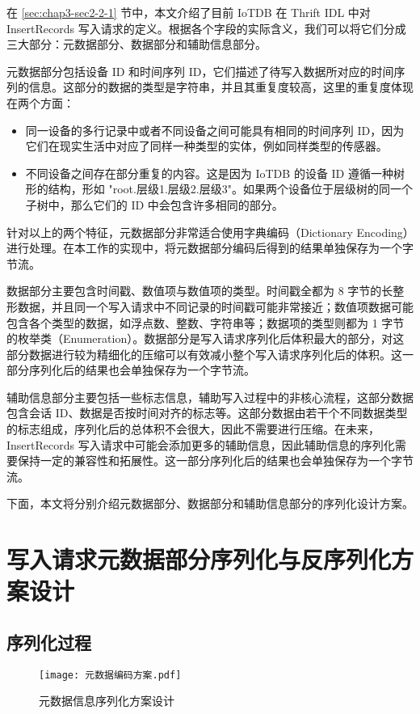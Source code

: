 在 \ref{sec:chap3-sec2-2-1} 节中，本文介绍了目前 IoTDB 在 Thrift IDL 中对 InsertRecords 写入请求的定义。根据各个字段的实际含义，我们可以将它们分成三大部分：元数据部分、数据部分和辅助信息部分。

元数据部分包括设备 ID 和时间序列 ID，它们描述了待写入数据所对应的时间序列的信息。这部分的数据的类型是字符串，并且其重复度较高，这里的重复度体现在两个方面：
\begin{itemize}
  \item 同一设备的多行记录中或者不同设备之间可能具有相同的时间序列 ID，因为它们在现实生活中对应了同样一种类型的实体，例如同样类型的传感器。
  \item 不同设备之间存在部分重复的内容。这是因为 IoTDB 的设备 ID 遵循一种树形的结构，形如 "root.层级1.层级2.层级3"。如果两个设备位于层级树的同一个子树中，那么它们的 ID 中会包含许多相同的部分。
\end{itemize}
针对以上的两个特征，元数据部分非常适合使用字典编码（Dictionary Encoding）进行处理。在本工作的实现中，将元数据部分编码后得到的结果单独保存为一个字节流。

数据部分主要包含时间戳、数值项与数值项的类型。时间戳全都为 8 字节的长整形数据，并且同一个写入请求中不同记录的时间戳可能非常接近；数值项数据可能包含各个类型的数据，如浮点数、整数、字符串等；数据项的类型则都为 1 字节的枚举类（Enumeration）。数据部分是写入请求序列化后体积最大的部分，对这部分数据进行较为精细化的压缩可以有效减小整个写入请求序列化后的体积。这一部分序列化后的结果也会单独保存为一个字节流。

辅助信息部分主要包括一些标志信息，辅助写入过程中的非核心流程，这部分数据包含会话 ID、数据是否按时间对齐的标志等。这部分数据由若干个不同数据类型的标志组成，序列化后的总体积不会很大，因此不需要进行压缩。在未来，InsertRecords 写入请求中可能会添加更多的辅助信息，因此辅助信息的序列化需要保持一定的兼容性和拓展性。这一部分序列化后的结果也会单独保存为一个字节流。

下面，本文将分别介绍元数据部分、数据部分和辅助信息部分的序列化设计方案。



\section{写入请求元数据部分序列化与反序列化方案设计}
\subsection{序列化过程}
\begin{figure}
  \centering
  \texttt{[image: 元数据编码方案.pdf]}
  \caption{元数据信息序列化方案设计}
  \label{fig:schema-encoding-general}
\end{figure}

